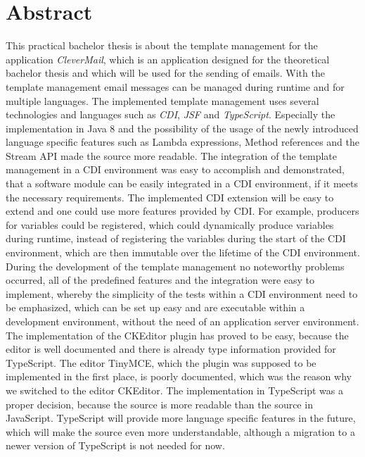 \chapter{Abstract}
This practical bachelor thesis is about the template management for the application \emph{CleverMail}, which is an application designed for the theoretical bachelor thesis and which will be used for the sending of emails. With the template management email messages can be managed during runtime and for multiple languages.
\newline
\newline
The implemented template management uses several technologies and languages such as \emph{CDI},  \emph{JSF} and \emph{TypeScript}. Especially the implementation in Java 8 and the possibility of the usage of the newly introduced language specific features such as Lambda expressions, Method references and the Stream API made the source more readable. The integration of the template management in a CDI environment was easy to accomplish and demonstrated, that a software module can be easily integrated in a CDI environment, if it meets the necessary requirements. The implemented CDI extension will be easy to extend and one could use more features provided by CDI. For example, producers for variables could be registered, which could dynamically produce variables during runtime, instead of registering the variables during the start of the CDI environment, which are then immutable over the lifetime of the CDI environment.
\newline
\newline
During the development of the template management no noteworthy problems occurred, all of the predefined features and the integration were easy to implement, whereby the simplicity of the tests within a CDI environment need to be emphasized, which can be set up easy and are executable within a development environment, without the need of an application server environment.
\newline
\newline
The implementation of the CKEditor plugin has proved to be easy, because the editor is well  documented and there is already type information provided for TypeScript. The editor TinyMCE, which the plugin was supposed to be implemented in the first place, is poorly documented, which was the reason why we switched to the editor CKEditor. The implementation in TypeScript was a proper decision, because the source is more readable than the source in JavaScript. TypeScript will provide more language specific features in the future, which will make the source even more understandable, although a migration to a newer version of TypeScript is not needed for now.
